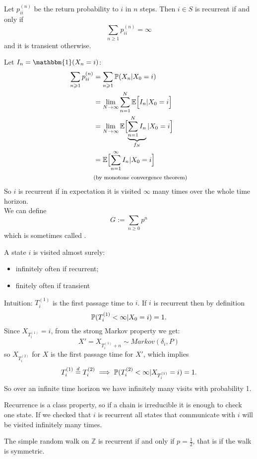 \documentclass{article}
\begin{document}
	\begin{proposition}
		Let $p_{ii}^{(n)}$ be the return probability to $i$ in $n$ steps. Then $i \in S$ is recurrent if and only if \[\sum_{n\geqslant 1} p_{ii}^{(n)}=\infty \] and it is transient otherwise.
	\end{proposition}
	Let $I_n=\mathbbm{1}(X_n=i)$:
	\begin{align*}
		\sum_{n\geqslant 1} p_{ii}^{(n)}&=\sum_{n\geqslant 1} \prob(X_n|X_0=i)\\
		&=\lim_{N \to \infty}\sum_{n=1}^N\ev{I_n|X_0=i}\\
		&=\lim_{N \to \infty}\ev{\underbrace{\sum_{n=1}^NI_n}_{\mathclap{f_N}}|X_0=i}\\
		&=\ev{\sum_{n=1}^{\infty}I_n|X_0=i}\\
		&\text{\footnotesize(by monotone convergence theorem)}
	\end{align*}
	So $i$ is recurrent if in expectation it is visited $\infty$ many times over the whole time horizon. \\
	We can define \[G:=\sum_{n\geqslant 0}p^n\] which is sometimes called .
	
	\begin{proposition}
		A state $i$ is visited almost surely:
		\begin{itemize}
			\item infinitely often if recurrent;
			\item finitely often if transient
		\end{itemize}
	\end{proposition}
	Intuition: $T_i^{(1)}$ is the first passage time to $i$. If $i$ is recurrent then by definition
	\[
	\mathbb{P}(T_i^{(1)}<\infty|X_0=i)=1.
	\]
	Since $X_{T_i^{(1)}}=i$, from the strong Markov property we get: \[X'=X_{T_i^{(1)}+n}\sim Markov(\delta_i,P)\]
	so $X_{T_i^{(2)}}$ for $X$ is the first passage time for $X'$, which implies 
	\[T_i^{(1)}\stackrel{d}{=}T_i^{(2)} \implies \mathbb{P}(T_i^{(2)}<\infty|X_{T_i^{(1)}}=i)=1.\]
	So over an infinite time horizon we have infinitely many visits with probability 1.
	
	Recurrence is a class property, so if a chain is irreducible it is enough to check one state. If we checked that $i$ is recurrent all states that communicate with $i$ will be visited infinitely many times.
	
	\begin{proposition}
		The simple random walk on $\mathbb{Z}$ is recurrent if and only if $p=\frac{1}{2}$, that is if the walk is symmetric. 
	\end{proposition}
	
\end{document}
